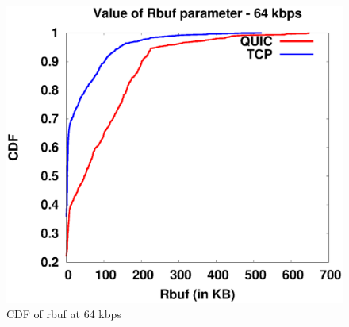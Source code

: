 \begin{figure}[!ht]
    \centering
    \includegraphics[width=0.9\linewidth]{img/CDF/plot_rbuf_65536}
    \caption{CDF of rbuf at 64 kbps}
    \label{fig:rbuf6556}
\end{figure}

